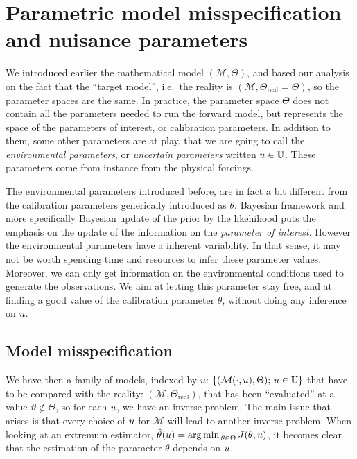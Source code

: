 \documentclass[../../Main_ManuscritThese.tex]{subfiles}
\begin{document}
\section{Parametric model misspecification and nuisance parameters}
\label{sec:model_misspecification}
We introduced earlier the mathematical model $(\mathcal{M},\Theta)$, and based our analysis on the fact that the ``target model'', i.e.\ the reality is $(\mathscr{M},\Theta_{\mathrm{real}} = \Theta)$, so the parameter spaces are the same.
In practice, the parameter space $\Theta$ does not contain all the parameters needed to run the forward model, but represents the space of the parameters of interest, or calibration parameters. In addition to them, some other parameters are at play, that we are going to call the \emph{environmental parameters}, or \emph{uncertain parameters} written $u\in \mathbb{U}$. These parameters come from instance from the physical forcings. 

The environmental parameters introduced before, are in fact a bit different from the calibration parameters generically introduced as $\theta$. Bayesian framework and more specifically Bayesian update of the prior by the likehihood puts the emphasis on the update of the information on the \emph{parameter of interest}. However the environmental parameters have a inherent variability. In that sense, it may not be worth spending time and resources to infer these parameter values. Moreover, we can only get information on the environmental conditions used to generate the observations.
We aim at letting this parameter stay free, and at finding a good value of the calibration parameter $\theta$, without doing any inference on $u$.


\subsection{Model misspecification}

We have then a family of models, indexed by $u$: $\{(\mathcal{M}(\cdot,u) , \Theta);\, u \in \mathbb{U}\}$ that have to be compared with the reality: $(\mathscr{M}, \Theta_{\mathrm{real}})$, that has been ``evaluated'' at a value $\vartheta \notin \Theta$, so for each $u$, we have an inverse problem.
The main issue that arises is that every choice of $u$ for $\mathcal{M}$ will lead to another inverse problem. When looking at an extremum estimator, $\hat{\theta}_{\mathrm{}}(u) = \operatorname*{arg\,min \,}_{\theta \in \Theta} J(\theta,u)$, it becomes clear that the estimation of the parameter $\theta$ depends on $u$.



\cite{white_maximum_1982}


\subfileLocal{
	\pagestyle{empty}
	
	
}
\end{document}
